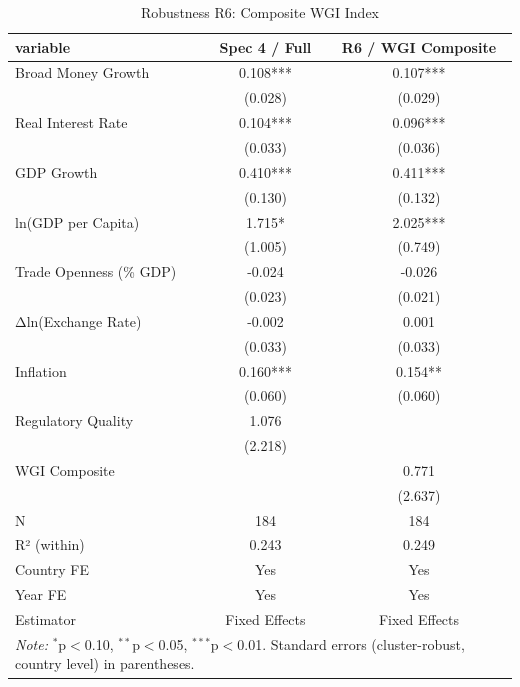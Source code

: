 \begin{table}[htbp]
\centering
\caption{Robustness R6: Composite WGI Index}
\label{tab:robustness_r6_composite_wgi}
\begin{tabular}{lcc}
\hline\hline
variable & Spec 4 / Full & R6 / WGI Composite \\
\hline
Broad Money Growth & 0.108*** & 0.107*** \\
 & (0.028) & (0.029) \\
Real Interest Rate & 0.104*** & 0.096*** \\
 & (0.033) & (0.036) \\
GDP Growth & 0.410*** & 0.411*** \\
 & (0.130) & (0.132) \\
ln(GDP per Capita) & 1.715* & 2.025*** \\
 & (1.005) & (0.749) \\
Trade Openness (\% GDP) & -0.024 & -0.026 \\
 & (0.023) & (0.021) \\
Δln(Exchange Rate) & -0.002 & 0.001 \\
 & (0.033) & (0.033) \\
Inflation & 0.160*** & 0.154** \\
 & (0.060) & (0.060) \\
Regulatory Quality & 1.076 &  \\
 & (2.218) &  \\
WGI Composite &  & 0.771 \\
 &  & (2.637) \\
\hline
N & 184 & 184 \\
R² (within) & 0.243 & 0.249 \\
Country FE & Yes & Yes \\
Year FE & Yes & Yes \\
Estimator & Fixed Effects & Fixed Effects \\
\hline\hline
\multicolumn{3}{l}{\textit{Note:} $^{*}$p$<$0.10, $^{**}$p$<$0.05, $^{***}$p$<$0.01. Standard errors (cluster-robust, country level) in parentheses.}
\end{tabular}
\end{table}